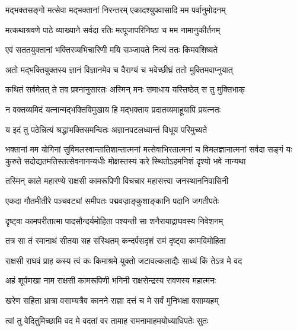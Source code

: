 \twolineshloka
{मद्भक्तसङ्गो मत्सेवा मद्भक्तानां निरन्तरम्}
{एकादश्युपवासादि मम पर्वानुमोदनम्} %

\twolineshloka
{मत्कथाश्रवणे पाठे व्याख्याने सर्वदा रतिः}
{मत्पूजापरिनिष्ठा च मम नामानुकीर्तनम्} %

\twolineshloka
{एवं सततयुक्तानां भक्तिरव्यभिचारिणी}
{मयि सञ्जायते नित्यं ततः किमवशिष्यते} %

\twolineshloka
{अतो मद्भक्तियुक्तस्य ज्ञानं विज्ञानमेव च}
{वैराग्यं च भवेच्छीघ्रं ततो मुक्तिमवाप्नुयात्} %

\twolineshloka
{कथितं सर्वमेतत् ते तव प्रश्नानुसारतः}
{अस्मिन् मनः समाधाय यस्तिष्ठेत् स तु मुक्तिभाक्} %

\twolineshloka
{न वक्तव्यमिदं यत्नान्मद्भक्तिविमुखाय हि}
{मद्भक्ताय प्रदातव्यमाहूयापि प्रयत्नतः} %

\twolineshloka
{य इदं तु पठेन्नित्यं श्रद्धाभक्तिसमन्वितः}
{अज्ञानपटलध्वान्तं विधूय परिमुच्यते} %

\fourlineindentedshloka
{भक्तानां मम योगिनां सुविमलस्वान्तातिशान्तात्मनां}
{मत्सेवाभिरतात्मनां च विमलज्ञानात्मनां सर्वदा}
{सङ्गं यः कुरुते सदोद्यतमतिस्तत्सेवनानन्यधीः}
{मोक्षस्तस्य करे स्थितोऽहमनिशं दृश्यो भवे नान्यथा} %






\twolineshloka
{तस्मिन् काले महारण्ये राक्षसी कामरूपिणी}
{विचचार महासत्त्वा जनस्थाननिवासिनी} %

\twolineshloka
{एकदा गौतमीतीरे पञ्चवट्यां समीपतः}
{पद्मवज्राङ्कुशाङ्कानि पदानि जगतीपतेः} %

\twolineshloka
{दृष्ट्वा कामपरीतात्मा पादसौन्दर्यमोहिता}
{पश्यन्ती सा शनैरायाद्राघवस्य निवेशनम्} %

\twolineshloka
{तत्र सा तं रमानाथं सीतया सह संस्थितम्}
{कन्दर्पसदृशं रामं दृष्ट्वा कामविमोहिता} %

\twolineshloka
{राक्षसी राघवं प्राह कस्य त्वं कः किमाश्रमे}
{युक्तो जटावल्कलाद्यैः साध्यं किं तेऽत्र मे वद} %

\twolineshloka
{अहं शूर्पणखा नाम राक्षसी कामरूपिणी}
{भगिनी राक्षसेन्द्रस्य रावणस्य महात्मनः} %

\twolineshloka
{खरेण सहिता भ्रात्रा वसाम्यत्रैव कानने}
{राज्ञा दत्तं च मे सर्वं मुनिभक्षा वसाम्यहम्} %

\twolineshloka
{त्वां तु वेदितुमिच्छामि वद मे वदतां वर}
{तामाह रामनामाहमयोध्याधिपतेः सुतः} %


